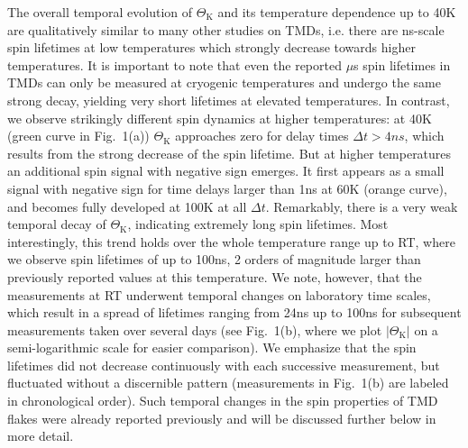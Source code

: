 \documentclass[prb,aps,superscriptaddress,reprint]{revtex4-1}
\begin{document}
The overall temporal evolution of $\Theta_\text{K}$ and its temperature dependence up to \unit{40}{K} are qualitatively similar to many other studies on TMDs, i.e. there are ns-scale spin lifetimes at low temperatures which strongly decrease towards higher temperatures.\cite{NatureComm.6.896, PhysRevB.90.161302, NanoLett.16.5010, NatPhys.11.830, NanoLett.15.8250,Kim2017Jul,Goryca2019Mar} It is important to note that even the reported $\mu$s spin lifetimes in TMDs can only be measured at cryogenic temperatures and undergo the same strong decay, yielding very short lifetimes at elevated temperatures.\cite{PhysRevLett.119.137401, Science.360.893, Kim2017Jul} In contrast, we observe strikingly different spin dynamics at higher temperatures: at \unit{40}{K} (green curve in Fig.~1(a)) $\Theta_\text{K}$ approaches zero for delay times $\Delta t>\unit{4}{ns}$, which results from the strong decrease of the spin lifetime. But at higher temperatures an additional spin signal with negative sign emerges. It first appears as a small signal with negative sign for time delays larger than \unit{1}{ns} at \unit{60}{K} (orange curve), and becomes fully developed at \unit{100}{K} at all $\Delta t$. Remarkably, there is a very weak temporal decay of $\Theta_\text{K}$, indicating extremely long spin lifetimes. Most interestingly, this trend holds over the whole temperature range up to RT, where we observe spin lifetimes of up to \unit{100}{ns}, 2 orders of magnitude larger than previously reported values at this temperature. We note, however, that the measurements at RT underwent temporal changes on laboratory time scales, which result in a spread of lifetimes ranging from \unit{24}{ns} up to \unit{100}{ns} for subsequent measurements taken over several days (see Fig.~1(b), where we plot $|\Theta_\text{K}|$ on a semi-logarithmic scale for easier comparison). We emphasize that the spin lifetimes did not decrease continuously with each successive measurement, but fluctuated without a discernible pattern (measurements in Fig.~1(b) are labeled in chronological order). Such temporal changes in the spin properties of TMD flakes were already reported previously\cite{PhysRevB.95.235408, APL.111.082404} and will be discussed further below in more detail.
\end{document}
